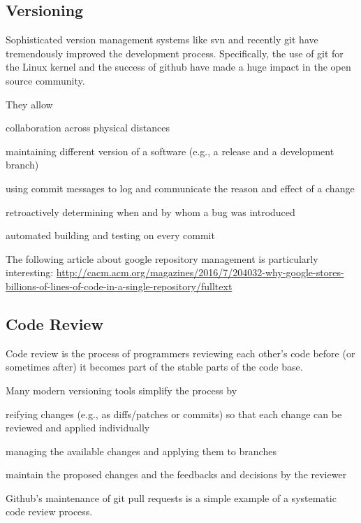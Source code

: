 \subsection{Versioning}

Sophisticated version management systems like svn and recently git have tremendously improved the development process.
Specifically, the use of git for the Linux kernel and the success of github have made a huge impact in the open source community.

They allow
\begin{compactitem}
 \item collaboration across physical distances
 \item maintaining different version of a software (e.g., a release and a development branch)
 \item using commit messages to log and communicate the reason and effect of a change
 \item retroactively determining when and by whom a bug was introduced
 \item automated building and testing on every commit
\end{compactitem}

The following article about google repository management is particularly interesting:
\url{http://cacm.acm.org/magazines/2016/7/204032-why-google-stores-billions-of-lines-of-code-in-a-single-repository/fulltext}

\subsection{Code Review}

Code review is the process of programmers reviewing each other's code before (or sometimes after) it becomes part of the stable parts of the code base.

Many modern versioning tools simplify the process by
\begin{compactitem}
 \item reifying changes (e.g., as diffs/patches or commits) so that each change can be reviewed and applied individually
 \item managing the available changes and applying them to branches
 \item maintain the proposed changes and the feedbacks and decisions by the reviewer
\end{compactitem}

Github's maintenance of git pull requests is a simple example of a systematic code review process.

